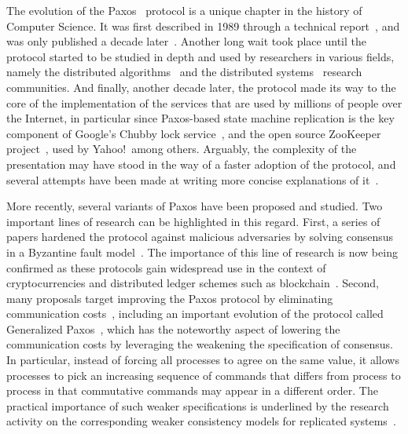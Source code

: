The evolution of the Paxos~\cite{paxos:tocs} protocol is a unique
chapter in the history of Computer Science. It was first described in
1989 through a technical report~\cite{paxos:tr}, and was only
published a decade later~\cite{paxos:tocs}. Another long wait took
place until the protocol started to be studied in depth and used by
researchers in various fields, namely the distributed
algorithms~\cite{deprisco} and the distributed systems~\cite{petal}
research communities. And finally, another decade later, the protocol
made its way to the core of the implementation of the services that
are used by millions of people over the Internet, in particular since
Paxos-based state machine replication is the key component of Google's
Chubby lock service~\cite{chubby}, and the open source ZooKeeper
project~\cite{zookeeper}, used by Yahoo!\ among others. Arguably, the
complexity of the presentation may have stood in the way of a faster
adoption of the protocol, and several attempts have been made at
writing more concise explanations of
it~\cite{paxos:simple,paxos:moderatelycomplex}.


More recently, several variants of Paxos have been proposed and
studied. Two important lines of research can be highlighted in this
regard. First, a series of papers hardened the protocol against
malicious adversaries by solving consensus in a Byzantine fault
model~\cite{pbft, byz:paxos}. The importance of this line of
research is now being confirmed as these protocols gain widespread
use in the context of cryptocurrencies and distributed ledger
schemes such as blockchain~\cite{blockchain}.
Second, many proposals target improving
the Paxos protocol by eliminating communication costs~\cite{fastpaxos},
including an important evolution of the protocol called Generalized
Paxos~\cite{generalized:paxos}, which has the noteworthy aspect of
lowering the communication costs by leveraging the weakening the
specification of consensus. In particular, instead of forcing all
processes to agree on the same value, it allows processes to pick an
increasing sequence of commands that differs from process to process
in that commutative commands may appear in a different order.
The practical importance of such weaker specifications is underlined
by the research activity on the corresponding weaker consistency
models for replicated systems~\cite{weakconsistency}.


